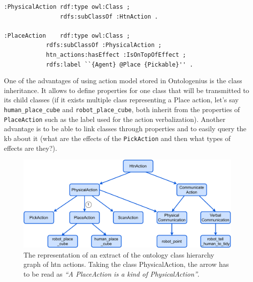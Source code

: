 \documentclass[a4paper,11pt,twoside]{StyleThese}
\begin{document}
\begin{lstlisting}[style=OwlTurtle, label={chap2:lst:classes}, caption={Description of ontology classes in the OWL language using the Turle syntax.} ]
:PhysicalAction	rdf:type owl:Class ;
				rdfs:subClassOf :HtnAction .

:PlaceAction	rdf:type owl:Class ;
			rdfs:subClassOf :PhysicalAction ;
			htn_actions:hasEffect :IsOnTopOfEffect ;
			rdfs:label ``{Agent} @Place {Pickable}'' .

\end{lstlisting}

One of the advantages of using action model stored in Ontologenius is the class inheritance. It allows to define properties for one class that will be transmitted to its child classes (\eg if it exists multiple class representing a Place action, let's say \verb'human_place_cube' and \verb'robot_place_cube', both inherit from the properties of \verb'PlaceAction' such as the label used for the action verbalization). Another advantage is to be able to link classes through properties and to easily query the \acrshort{kb} about it (\eg what are the effects of the \verb'PickAction' and then what types of effects are they?).

\begin{figure}[!ht]
	\includegraphics[width=\linewidth]{figures/chapter2/class_actions.pdf}
	\caption{The representation of an extract of the ontology class hierarchy graph of \acrshort{htn} actions. Taking the class PhysicalAction, the arrow  has to be read	as \textit{``A PlaceAction is a kind of PhysicalAction''}.}
	\label{chap6:fig:class_actions}
\end{figure}
\end{document}
